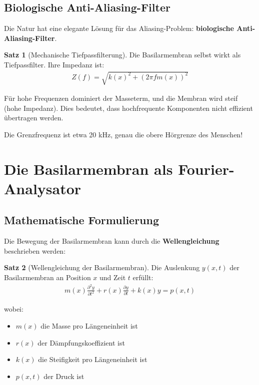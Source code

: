 ﻿\documentclass[a4paper,12pt]{report}
\theoremstyle{definition}
\newtheorem{satz}{Satz}
\begin{document}
	\subsection{Biologische Anti-Aliasing-Filter}
	
	Die Natur hat eine elegante Lösung für das Aliasing-Problem: \textbf{biologische Anti-Aliasing-Filter}.
	
	\begin{satz}[Mechanische Tiefpassfilterung]
		Die Basilarmembran selbst wirkt als Tiefpassfilter. Ihre Impedanz ist:
		\begin{align}
			Z(f) = \sqrt{k(x)^2 + (2\pi f m(x))^2}
		\end{align}
		
		Für hohe Frequenzen dominiert der Masseterm, und die Membran wird steif (hohe Impedanz). Dies bedeutet, dass hochfrequente Komponenten nicht effizient übertragen werden.
		
		Die Grenzfrequenz ist etwa 20 kHz, genau die obere Hörgrenze des Menschen!
	\end{satz}
	
	\section{Die Basilarmembran als Fourier-Analysator}
	
	\subsection{Mathematische Formulierung}
	
	Die Bewegung der Basilarmembran kann durch die \textbf{Wellengleichung} beschrieben werden:
	
	\begin{satz}[Wellengleichung der Basilarmembran]
		Die Auslenkung $y(x,t)$ der Basilarmembran an Position $x$ und Zeit $t$ erfüllt:
		\begin{align}
			m(x) \frac{\partial^2 y}{\partial t^2} + r(x) \frac{\partial y}{\partial t} + k(x) y = p(x,t)
		\end{align}
		
		wobei:
		\begin{itemize}
			\item[-] $m(x)$ die Masse pro Längeneinheit ist
			\item[-] $r(x)$ der Dämpfungskoeffizient ist
			\item[-] $k(x)$ die Steifigkeit pro Längeneinheit ist
			\item[-] $p(x,t)$ der Druck ist
		\end{itemize}
	\end{satz}
	
\end{document}
